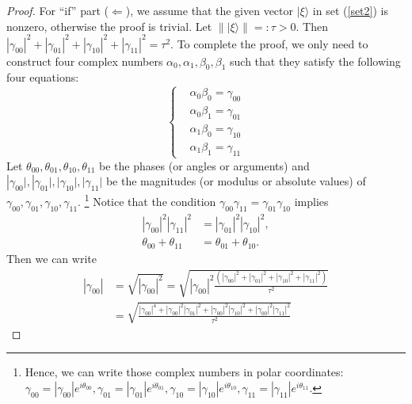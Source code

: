 \begin{example}
\begin{proof}
        For ``if'' part ($\Longleftarrow$), we assume that the given vector $|\xi\rangle$ in set (\ref{set2}) is nonzero, otherwise the proof is trivial. Let $\| |\xi\rangle \| =: \tau >0$. Then $\left|\gamma_{00}\right|^2+\left|\gamma_{01}\right|^2+\left|\gamma_{10}\right|^2+\left|\gamma_{11}\right|^2 = \tau^2.$
        To complete the proof, we only need to construct four complex numbers $\alpha_0, \alpha_1, \beta_0, \beta_1$ such that they satisfy the following four equations:
        \begin{equation}
            \left\{
            \begin{aligned}
            & \alpha_0 \beta_0=\gamma_{00} \\
            & \alpha_0 \beta_1=\gamma_{01} \\
            & \alpha_1 \beta_0=\gamma_{10} \\
            & \alpha_1 \beta_1=\gamma_{11}
            \end{aligned}
            \right.
\end{equation}
    Let $\theta_{00}, \theta_{01}, \theta_{10}, \theta_{11}$ be the phases (or angles or arguments) and $\left|\gamma_{00}|,\right| \gamma_{01}|,| \gamma_{10}|,| \gamma_{11} |$ be the magnitudes (or modulus or absolute values) of $\gamma_{00}, \gamma_{01}, \gamma_{10}, \gamma_{11}$.
    \footnote{Hence, we can write those complex numbers in polar coordinates:
	$
	\gamma_{00}=\left|\gamma_{00}\right| e^{i \theta_{00}}, \gamma_{01}=\left|\gamma_{01}\right| e^{i \theta_{01}}, \gamma_{10}=\left|\gamma_{10}\right| e^{i \theta_{10}}, \gamma_{11}=\left|\gamma_{11}\right| e^{i \theta_{11}}.
	$}
    Notice that the condition $\gamma_{00} \gamma_{11}=\gamma_{01} \gamma_{10}$ implies
    \begin{align}
    \left|\gamma_{00}\right|^2\left|\gamma_{11}\right|^2 & =\left|\gamma_{01}\right|^2\left|\gamma_{10}\right|^2, \label{eq17} \\
    \theta_{00}+\theta_{11} & =\theta_{01}+\theta_{10}. \label{eq18} 
    \end{align}
    Then we can write 
    \begin{equation}
    \begin{aligned}
    \left|\gamma_{00}\right| & =\sqrt{\left|\gamma_{00}\right|^2}
    =\sqrt{
    \left|\gamma_{00}\right|^2
    \frac{\left(\left|\gamma_{00}\right|^2+\left|\gamma_{01}\right|^2+\left|\gamma_{10}\right|^2+\left|\gamma_{11}\right|^2\right)}{\tau^2}
    }
    \\
    & =\sqrt{
    \frac{\left|\gamma_{00}\right|^4+\left|\gamma_{00}\right|^2\left|\gamma_{01}\right|^2+\left|\gamma_{00}\right|^2\left|\gamma_{10}\right|^2+\left|\gamma_{00}\right|^2\left|\gamma_{11}\right|^2}{\tau^2}
}
\end{aligned}
\end{equation}
\end{proof}
\end{example}
